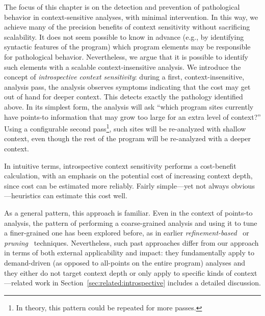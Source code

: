 The focus of this chapter is on the detection and prevention of pathological behavior in context-sensitive analyses, with minimal intervention. In this way, we achieve many of the precision benefits of context sensitivity without sacrificing scalability. It does not seem possible to know in advance (e.g., by identifying syntactic features of the program) which program elements may be responsible for pathological behavior. Nevertheless, we argue that it is possible to identify such elements with a scalable context-insensitive analysis. We introduce the concept of \emph{introspective context sensitivity}: during a first, context-insensitive, analysis pass, the analysis observes symptoms indicating that the cost may get out of hand for deeper context. This detects exactly the pathology identified above. In its simplest form, the analysis will ask ``which program sites currently have points-to information that may grow too large for an extra level of context?'' Using a configurable second pass\footnote{In theory, this pattern could be repeated for more passes.}, such sites will be re-analyzed with shallow context, even though the rest of the program will be re-analyzed with a deeper context.

In intuitive terms, introspective context sensitivity performs a cost-benefit calculation, with an emphasis on the potential cost of increasing context depth, since cost can be estimated more reliably. Fairly simple---yet not always obvious---heuristics can estimate this cost well. 

As a general pattern, this approach is familiar. Even in the context of points-to analysis, the pattern of performing a coarse-grained analysis and using it to tune a finer-grained one has been explored before, as in earlier \emph{refinement-based}~\cite{pldi:2006:Sridharan} or \emph{pruning}~\cite{pldi:2011:Liang} techniques. Nevertheless, such past approaches differ from our approach in terms of both external applicability and impact: they fundamentally apply to demand-driven (as opposed to all-points on the entire program) analyses and they either do not target context depth or only apply to specific kinds of context---related work in Section~\ref{sec:related:introspective} includes a detailed discussion.

